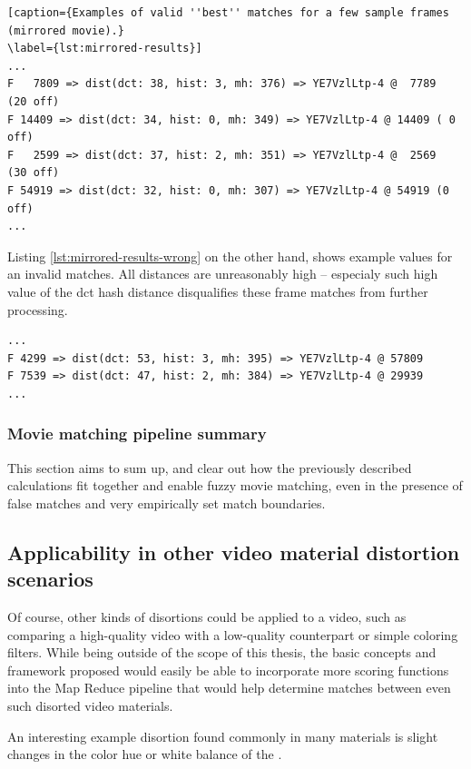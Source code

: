 \begin{lstlisting}[caption={Examples of valid ''best'' matches for a few sample frames (mirrored movie).}
\label={lst:mirrored-results}]
...
F   7809 => dist(dct: 38, hist: 3, mh: 376) => YE7VzlLtp-4 @  7789   (20 off)
F 14409 => dist(dct: 34, hist: 0, mh: 349) => YE7VzlLtp-4 @ 14409 ( 0 off)
F   2599 => dist(dct: 37, hist: 2, mh: 351) => YE7VzlLtp-4 @  2569   (30 off)
F 54919 => dist(dct: 32, hist: 0, mh: 307) => YE7VzlLtp-4 @ 54919 (0 off)
...
\end{lstlisting}

Listing \ref{lst:mirrored-results-wrong} on the other hand, shows example values for an invalid matches. All distances are unreasonably high -- especialy such high value of the dct hash distance disqualifies these frame matches from further processing.

\begin{lstlisting}[caption={Examples of invalid matches for a few sample frames.}, label={lst:mirrored-results-wrong}]
...
F 4299 => dist(dct: 53, hist: 3, mh: 395) => YE7VzlLtp-4 @ 57809
F 7539 => dist(dct: 47, hist: 2, mh: 384) => YE7VzlLtp-4 @ 29939
...
\end{lstlisting}


\subsubsection{Movie matching pipeline summary}
This section aims to sum up, and clear out how the previously described calculations fit together and enable fuzzy movie matching, even in the presence of false matches and very empirically set match boundaries.



\subsection{Applicability in other video material distortion scenarios}

Of course, other kinds of disortions could be applied to a video, such as comparing a high-quality video with a low-quality counterpart or simple coloring filters. While being outside of the scope of this thesis, the basic concepts and framework proposed would easily be able to incorporate more scoring functions into the Map Reduce pipeline that would help determine matches between even such disorted video materials. 

An interesting example disortion found commonly in many materials is slight changes in the color hue or white balance of the .


